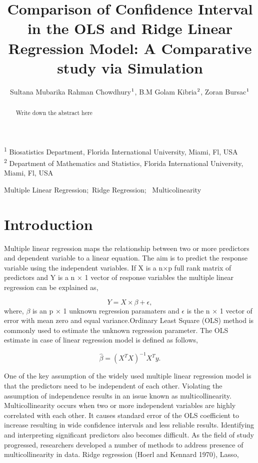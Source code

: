 \documentclass[
]{interact}
\title{Comparison of Confidence Interval in the OLS and Ridge Linear
Regression Model: A Comparative study via Simulation}
\author{Sultana Mubarika Rahman Chowdhury$\textsuperscript{1}$, B.M
Golam Kibria$\textsuperscript{2}$, Zoran Bursac$\textsuperscript{1}$}
\begin{document}
\captionsetup{labelsep=space}
\maketitle
\textsuperscript{1} Biosatistics Department, Florida International
University, Miami, Fl, USA\\ \textsuperscript{2} Department of
Mathematics and Statistics, Florida International University, Miami,
Fl, USA
\begin{abstract}
Write down the abstract here
\end{abstract}
\begin{keywords}
\def\sep{;\ }
Multiple Linear Regression\sep Ridge Regression\sep 
Multicolinearity
\end{keywords}

\section{Introduction}\label{introduction}

Multiple linear regression maps the relationship between two or more
predictors and dependent variable to a linear equation. The aim is to
predict the response variable using the independent variables. If X is a
n×p full rank matrix of predictors and Y is a n × 1 vector of response
variables the multiple linear regression can be explained as,

\[Y = X \times \beta + \epsilon, \] where, \(\beta\) is an p × 1 unknown
regression paramaters and \(\epsilon\) is the n × 1 vector of error with
mean zero and equal variance.Ordinary Least Square (OLS) method is
commonly used to estimate the unknown regression parameter. The OLS
estimate in case of linear regression model is defined as follows,

\[\hat{\beta} = (X^T X)^{-1} X^T y.\]

One of the key assumption of the widely used multiple linear regression
model is that the predictors need to be independent of each other.
Violating the assumption of independence results in an issue known as
multicollinearity. Multicollinearity occurs when two or more independent
variables are highly correlated with each other. It causes standard
error of the OLS coefficient to increase resulting in wide confidence
intervals and less reliable results. Identifying and interpreting
significant predictors also becomes difficult. As the field of study
progressed, researchers developed a number of methods to address
presence of multicollinearity in data. Ridge regression (Hoerl and
Kennard 1970), Lasso,
\end{document}
